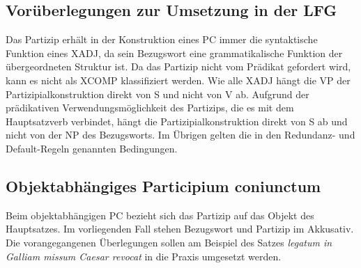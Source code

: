 \documentclass[12pt,a4paper]{article}
\begin{document}
\subsection{Vorüberlegungen zur Umsetzung in der LFG}
Das Partizip erhält in der Konstruktion eines PC immer die syntaktische Funktion eines XADJ, da sein Bezugswort eine grammatikalische Funktion der übergeordneten Struktur ist. Da das Partizip nicht vom Prädikat gefordert wird, kann es nicht als XCOMP klassifiziert werden. Wie alle XADJ hängt die VP der Partizipialkonstruktion direkt von S und nicht von V ab. Aufgrund der prädikativen Verwendungsmöglichkeit des Partizips, die es mit dem Hauptsatzverb verbindet, hängt die Partizipialkonstruktion direkt von S ab und nicht von der NP des Bezugsworts.
Im Übrigen gelten die in den Redundanz- und Default-Regeln genannten Bedingungen.

\subsection{Objektabhängiges Participium coniunctum}
Beim objektabhängigen PC bezieht sich das Partizip auf das Objekt des Hauptsatzes. Im vorliegenden Fall stehen Bezugswort und Partizip im Akkusativ. \\
Die vorangegangenen Überlegungen sollen am Beispiel des Satzes \textit{legatum in Galliam missum Caesar revocat} in die Praxis umgesetzt werden.
\end{document}
